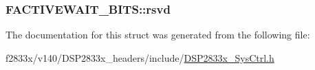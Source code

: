 \subsubsection[{rsvd}]{ F\+A\+C\+T\+I\+V\+E\+W\+A\+I\+T\+\_\+\+B\+I\+T\+S\+::rsvd}\label{struct_f_a_c_t_i_v_e_w_a_i_t___b_i_t_s_a32609d601ac20bd394aba79efa655b42}


The documentation for this struct was generated from the following file\+:\begin{DoxyCompactItemize}
\item 
f2833x/v140/\+D\+S\+P2833x\+\_\+headers/include/\hyperlink{_d_s_p2833x___sys_ctrl_8h}{D\+S\+P2833x\+\_\+\+Sys\+Ctrl.\+h}\end{DoxyCompactItemize}
